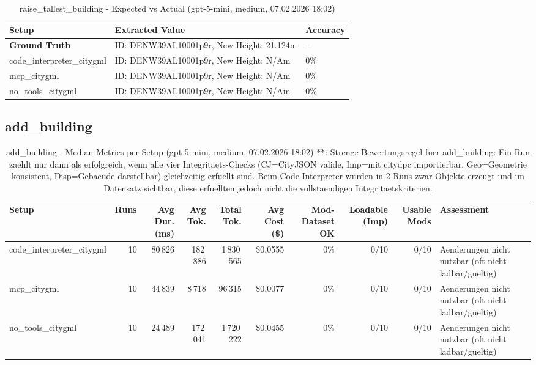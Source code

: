 \documentclass[a4paper,11pt]{article}
\begin{document}
\begin{table}[H]
\centering
\scriptsize
\caption{raise\_tallest\_building - Expected vs Actual (gpt-5-mini, medium, 07.02.2026 18:02)}
\begin{tabular}{l l l}
\toprule
Setup & Extracted Value & Accuracy \\
\midrule
\textbf{Ground Truth} & ID: DENW39AL10001p9r, New Height: 21.124m & -- \\
\midrule
code\_interpreter\_citygml & ID: DENW39AL10001p9r, New Height: N/Am & 0\% \\
mcp\_citygml & ID: DENW39AL10001p9r, New Height: N/Am & 0\% \\
no\_tools\_citygml & ID: DENW39AL10001p9r, New Height: N/Am & 0\% \\
\bottomrule
\end{tabular}
\end{table}

\clearpage

\subsection{add\_building}

\begin{table}[H]
\centering
\scriptsize
\caption{add\_building - Median Metrics per Setup (gpt-5-mini, medium, 07.02.2026 18:02) **: Strenge Bewertungsregel fuer add\_building: Ein Run zaehlt nur dann als erfolgreich, wenn alle vier Integritaets-Checks (CJ=CityJSON valide, Imp=mit citydpc importierbar, Geo=Geometrie konsistent, Disp=Gebaeude darstellbar) gleichzeitig erfuellt sind. Beim Code Interpreter wurden in 2 Runs zwar Objekte erzeugt und im Datensatz sichtbar, diese erfuellten jedoch nicht die vollstaendigen Integritaetskriterien.}
\label{tab:combined\_add\_building\_metrics\_20260207}
\begin{tabular}{l r r r r r r r r l}
\toprule
Setup & Runs & Avg Dur. (ms) & Avg Tok. & Total Tok. & Avg Cost (\$) & Mod-Dataset OK & Loadable (Imp) & Usable Mods & Assessment \\
\midrule
code\_interpreter\_citygml & 10 & 80\,826 & 182\,886 & 1\,830\,565 & \$0.0555 & 0\% & 0/10 & 0/10 & Aenderungen nicht nutzbar (oft nicht ladbar/gueltig) \\
mcp\_citygml & 10 & 44\,839 & 8\,718 & 96\,315 & \$0.0077 & 0\% & 0/10 & 0/10 & Aenderungen nicht nutzbar (oft nicht ladbar/gueltig) \\
no\_tools\_citygml & 10 & 24\,489 & 172\,041 & 1\,720\,222 & \$0.0455 & 0\% & 0/10 & 0/10 & Aenderungen nicht nutzbar (oft nicht ladbar/gueltig) \\
\bottomrule
\end{tabular}
\end{table}
\end{document}
